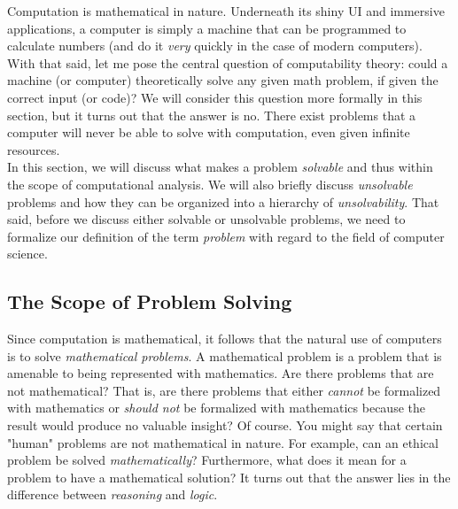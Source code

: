 


Computation is mathematical in nature. Underneath its shiny UI and immersive applications, a computer is simply a machine that can be programmed to calculate numbers (and do it \textit{very} quickly in the case of modern computers). With that said, let me pose the central question of computability theory: could a machine (or computer) theoretically solve any given math problem, if given the correct input (or code)? We will consider this question more formally in this section, but it turns out that the answer is no. There exist problems that a computer will never be able to solve with computation, even given infinite resources. \\

In this section, we will discuss what makes a problem \textit{solvable} and thus within the scope of computational analysis. We will also briefly discuss \textit{unsolvable} problems and how they can be organized into a hierarchy of \textit{unsolvability}. That said, before we discuss either solvable or unsolvable problems, we need to formalize our definition of the term \textit{problem} with regard to the field of computer science. \\


\subsection{The Scope of Problem Solving}




Since computation is mathematical, it follows that the natural use of computers is to solve \textit{mathematical problems}. A mathematical problem is a problem that is amenable to being represented with mathematics. Are there problems that are not mathematical? That is, are there problems that either \textit{cannot} be formalized with mathematics or \textit{should not} be formalized with mathematics because the result would produce no valuable insight? Of course. You might say that certain "human" problems are not mathematical in nature. For example, can an ethical problem be solved \textit{mathematically}? Furthermore, what does it mean for a problem to have a mathematical solution? It turns out that the answer lies in the difference between \textit{reasoning} and \textit{logic}. \\

